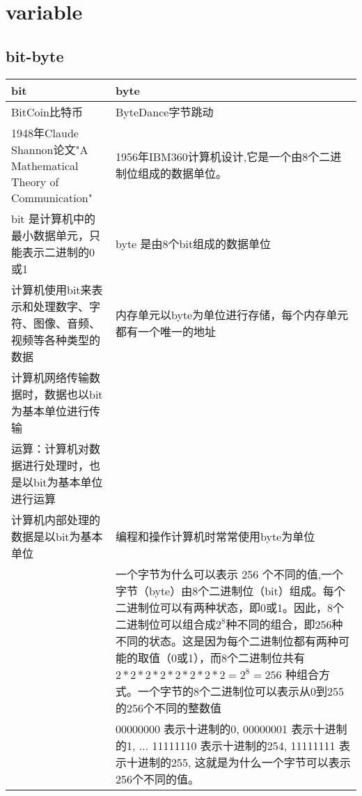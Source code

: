 \documentclass[12pt,twiside,a4paper]{ctexbook}
\numberwithin{chapter}{part}
\begin{document}

\chapter{variable}
\section{bit-byte}
\begin{tabular}{|p{8cm}|p{8cm}|}
\hline
bit & byte\\
\hline
BitCoin比特币 & ByteDance字节跳动\\
\hline
1948年Claude Shannon论文"A Mathematical Theory of Communication"&1956年IBM360计算机设计,它是一个由8个二进制位组成的数据单位。\\
\hline
bit 是计算机中的最小数据单元，只能表示二进制的0或1 & byte 是由8个bit组成的数据单位\\
 \hline
计算机使用bit来表示和处理数字、字符、图像、音频、视频等各种类型的数据 &内存单元以byte为单位进行存储，每个内存单元都有一个唯一的地址 \\
 \hline
计算机网络传输数据时，数据也以bit为基本单位进行传输 & \\
 \hline
运算：计算机对数据进行处理时，也是以bit为基本单位进行运算 & \\
 \hline
计算机内部处理的数据是以bit为基本单位 &编程和操作计算机时常常使用byte为单位 \\
 \hline
 & 一个字节为什么可以表示 256 个不同的值,一个字节（byte）由8个二进制位（bit）组成。每个二进制位可以有两种状态，即0或1。因此，8个二进制位可以组合成$2^8$种不同的组合，即256种不同的状态。这是因为每个二进制位都有两种可能的取值（0或1），而8个二进制位共有$2 * 2 * 2 * 2 * 2 * 2 * 2 * 2 = 2^8 = 256$ 种组合方式。一个字节的8个二进制位可以表示从0到255的256个不同的整数值\\
 & 00000000 表示十进制的0,
00000001 表示十进制的1,
...
11111110 表示十进制的254,
11111111 表示十进制的255,
这就是为什么一个字节可以表示256个不同的值。\\
\hline
\end{tabular}\\
\end{document}
